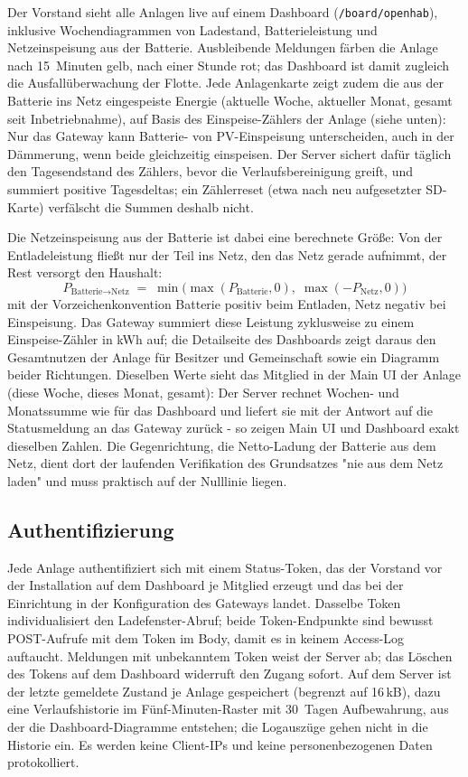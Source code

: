 \documentclass[11pt,a4paper]{article}
\newcommand{\code}[1]{\texttt{#1}}
\begin{document}
Der Vorstand sieht alle Anlagen live auf einem Dashboard
(\code{/board/openhab}), inklusive Wochendiagrammen von Ladestand,
Batterieleistung und Netzeinspeisung aus der Batterie. Ausbleibende
Meldungen färben die Anlage nach 15~Minuten gelb, nach einer Stunde rot;
das Dashboard ist damit zugleich die Ausfallüberwachung der Flotte.
Jede Anlagenkarte zeigt zudem die aus der Batterie ins Netz eingespeiste
Energie (aktuelle Woche, aktueller Monat, gesamt seit Inbetriebnahme), auf
Basis des Einspeise-Zählers der Anlage (siehe unten): Nur das Gateway kann
Batterie- von PV-Einspeisung unterscheiden, auch in der Dämmerung, wenn
beide gleichzeitig einspeisen. Der Server sichert dafür täglich den
Tagesendstand des Zählers, bevor die Verlaufsbereinigung greift, und
summiert positive Tagesdeltas; ein Zählerreset (etwa nach neu
aufgesetzter SD-Karte) verfälscht die Summen deshalb nicht.

Die Netzeinspeisung aus der Batterie ist dabei eine berechnete Größe: Von
der Entladeleistung fließt nur der Teil ins Netz, den das Netz gerade
aufnimmt, der Rest versorgt den Haushalt:
\begin{equation}
  P_{\text{Batterie}\rightarrow\text{Netz}} \;=\;
  \min\bigl(\max(P_{\text{Batterie}},0),\; \max(-P_{\text{Netz}},0)\bigr)
\end{equation}
mit der Vorzeichenkonvention Batterie positiv beim Entladen, Netz negativ
bei Einspeisung. Das Gateway summiert diese Leistung zyklusweise zu einem
Einspeise-Zähler in kWh auf; die Detailseite des Dashboards zeigt daraus
den Gesamtnutzen der Anlage für Besitzer und Gemeinschaft sowie ein
Diagramm beider Richtungen. Dieselben Werte sieht das Mitglied in der
Main UI der Anlage (diese Woche, dieses Monat, gesamt): Der Server rechnet
Wochen- und Monatssumme wie für das Dashboard und liefert sie mit der
Antwort auf die Statusmeldung an das Gateway zurück - so zeigen Main UI
und Dashboard exakt dieselben Zahlen. Die Gegenrichtung, die Netto-Ladung der
Batterie aus dem Netz, dient dort der laufenden Verifikation des
Grundsatzes "nie aus dem Netz laden" und muss praktisch auf der Nulllinie
liegen.

\subsection{Authentifizierung}

Jede Anlage authentifiziert sich mit einem Status-Token, das der Vorstand
vor der Installation auf dem Dashboard je Mitglied erzeugt und das bei der
Einrichtung in der Konfiguration des Gateways landet. Dasselbe Token
individualisiert den Ladefenster-Abruf; beide Token-Endpunkte sind bewusst
POST-Aufrufe mit dem Token im Body, damit es in keinem Access-Log
auftaucht. Meldungen mit unbekanntem Token weist der Server ab; das
Löschen des Tokens auf dem Dashboard widerruft den Zugang sofort. Auf dem
Server ist der letzte gemeldete Zustand je Anlage gespeichert (begrenzt
auf 16\,kB), dazu eine Verlaufshistorie im Fünf-Minuten-Raster mit
30~Tagen Aufbewahrung, aus der die Dashboard-Diagramme entstehen; die
Logauszüge gehen nicht in die Historie ein. Es werden keine Client-IPs
und keine personenbezogenen Daten protokolliert.
\end{document}
